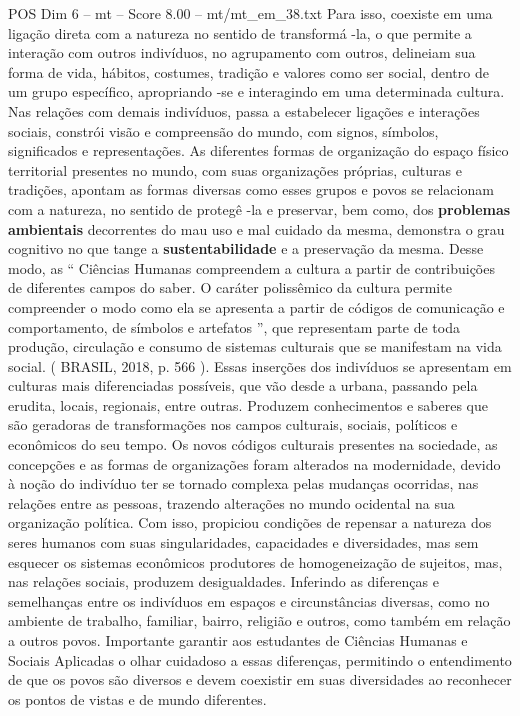 \begin{textsample}{POS Dim 6 – mt – Score 8.00 – mt/mt\_em\_38.txt}
Para isso, coexiste em uma ligação direta com a natureza no sentido de transformá -la, o que permite a interação com outros indivíduos, no agrupamento com outros, delineiam sua forma de vida, hábitos, costumes, tradição e valores como ser social, dentro de um grupo específico, apropriando -se e interagindo em uma determinada cultura.
Nas relações com demais indivíduos, passa a estabelecer ligações e interações sociais, constrói visão e compreensão do mundo, com signos, símbolos, significados e representações.
As diferentes formas de organização do espaço físico territorial presentes no mundo, com suas organizações próprias, culturas e tradições, apontam as formas diversas como esses grupos e povos se relacionam com a natureza, no sentido de protegê -la e preservar, bem como, dos \textbf{problemas} \textbf{ambientais} decorrentes do mau uso e mal cuidado da mesma, demonstra o grau cognitivo no que tange a \textbf{sustentabilidade} e a preservação da mesma.
Desse modo, as “ Ciências Humanas compreendem a cultura a partir de contribuições de diferentes campos do saber.
O caráter polissêmico da cultura permite compreender o modo como ela se apresenta a partir de códigos de comunicação e comportamento, de símbolos e artefatos ”, que representam parte de toda produção, circulação e consumo de sistemas culturais que se manifestam na vida social. ( BRASIL, 2018, p. 566 ).
Essas inserções dos indivíduos se apresentam em culturas mais diferenciadas possíveis, que vão desde a urbana, passando pela erudita, locais, regionais, entre outras.
Produzem conhecimentos e saberes que são geradoras de transformações nos campos culturais, sociais, políticos e econômicos do seu tempo.
Os novos códigos culturais presentes na sociedade, as concepções e as formas de organizações foram alterados na modernidade, devido à noção do indivíduo ter se tornado complexa pelas mudanças ocorridas, nas relações entre as pessoas, trazendo alterações no mundo ocidental na sua organização política.
Com isso, propiciou condições de repensar a natureza dos seres humanos com suas singularidades, capacidades e diversidades, mas sem esquecer os sistemas econômicos produtores de homogeneização de sujeitos, mas, nas relações sociais, produzem desigualdades.
Inferindo as diferenças e semelhanças entre os indivíduos em espaços e circunstâncias diversas, como no ambiente de trabalho, familiar, bairro, religião e outros, como também em relação a outros povos.
Importante garantir aos estudantes de Ciências Humanas e Sociais Aplicadas o olhar cuidadoso a essas diferenças, permitindo o entendimento de que os povos são diversos e devem coexistir em suas diversidades ao reconhecer os pontos de vistas e de mundo diferentes.

\end{textsample}
